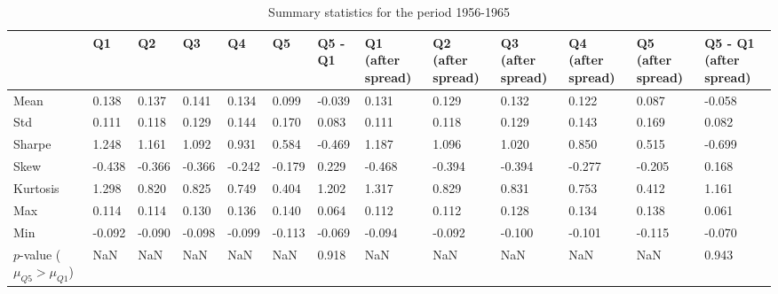 \begin{table}
\caption{Summary statistics for the period 1956-1965}
\label{tab:summary_1956_1965}
\begin{tabular}{lllllllllllll}
\toprule
 & Q1 & Q2 & Q3 & Q4 & Q5 & Q5 - Q1 & Q1 (after spread) & Q2 (after spread) & Q3 (after spread) & Q4 (after spread) & Q5 (after spread) & Q5 - Q1 (after spread) \\
\midrule
Mean & 0.138 & 0.137 & 0.141 & 0.134 & 0.099 & -0.039 & 0.131 & 0.129 & 0.132 & 0.122 & 0.087 & -0.058 \\
Std & 0.111 & 0.118 & 0.129 & 0.144 & 0.170 & 0.083 & 0.111 & 0.118 & 0.129 & 0.143 & 0.169 & 0.082 \\
Sharpe & 1.248 & 1.161 & 1.092 & 0.931 & 0.584 & -0.469 & 1.187 & 1.096 & 1.020 & 0.850 & 0.515 & -0.699 \\
Skew & -0.438 & -0.366 & -0.366 & -0.242 & -0.179 & 0.229 & -0.468 & -0.394 & -0.394 & -0.277 & -0.205 & 0.168 \\
Kurtosis & 1.298 & 0.820 & 0.825 & 0.749 & 0.404 & 1.202 & 1.317 & 0.829 & 0.831 & 0.753 & 0.412 & 1.161 \\
Max & 0.114 & 0.114 & 0.130 & 0.136 & 0.140 & 0.064 & 0.112 & 0.112 & 0.128 & 0.134 & 0.138 & 0.061 \\
Min & -0.092 & -0.090 & -0.098 & -0.099 & -0.113 & -0.069 & -0.094 & -0.092 & -0.100 & -0.101 & -0.115 & -0.070 \\
$p$-value ($\mu_{Q5} > \mu_{Q1}$) & NaN & NaN & NaN & NaN & NaN & 0.918 & NaN & NaN & NaN & NaN & NaN & 0.943 \\
\bottomrule
\end{tabular}
\end{table}

